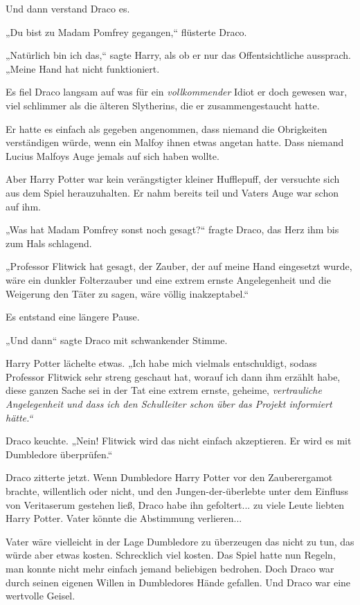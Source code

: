 {Und dann verstand Draco es.

„Du bist zu Madam Pomfrey gegangen,“ flüsterte Draco.

„Natürlich bin ich das,“ sagte Harry, als ob er nur das Offentsichtliche aussprach. „Meine Hand hat nicht funktioniert.

Es fiel Draco langsam auf was für ein \emph{vollkommender} Idiot er doch gewesen war, viel schlimmer als die älteren Slytherins, die er zusammengestaucht hatte.

Er hatte es einfach als gegeben angenommen, dass niemand die Obrigkeiten verständigen würde, wenn ein Malfoy ihnen etwas angetan hatte. Dass niemand Lucius Malfoys Auge jemals auf sich haben wollte.

Aber Harry Potter war kein verängstigter kleiner Hufflepuff, der versuchte sich aus dem Spiel herauzuhalten. Er nahm bereits teil und Vaters Auge war schon auf ihm.

„Was hat Madam Pomfrey sonst noch gesagt?“ fragte Draco, das Herz ihm bis zum Hals schlagend.

„Professor Flitwick hat gesagt, der Zauber, der auf meine Hand eingesetzt wurde, wäre ein dunkler Folterzauber und eine extrem ernste Angelegenheit und die Weigerung den Täter zu sagen, wäre völlig inakzeptabel.“

Es entstand eine längere Pause.

„Und dann“ sagte Draco mit schwankender Stimme.

Harry Potter lächelte etwas. „Ich habe mich vielmals entschuldigt, sodass Professor Flitwick sehr streng geschaut hat, worauf ich dann ihm erzählt habe, diese ganzen Sache sei in der Tat eine extrem ernste, geheime, \emph{vertrauliche Angelegenheit und dass ich den Schulleiter schon über das Projekt informiert hätte.“}

Draco keuchte. „Nein! Flitwick wird das nicht einfach akzeptieren. Er wird es mit Dumbledore überprüfen.“

Draco zitterte jetzt. Wenn Dumbledore Harry Potter vor den Zauberergamot brachte, willentlich oder nicht, und den Jungen-der-überlebte unter dem Einfluss von Veritaserum gestehen ließ, Draco habe ihn gefoltert... zu viele Leute liebten Harry Potter. Vater könnte die Abstimmung verlieren...

Vater wäre vielleicht in der Lage Dumbledore zu überzeugen das nicht zu tun, das würde aber etwas kosten. Schrecklich viel kosten. Das Spiel hatte nun Regeln, man konnte nicht mehr einfach jemand beliebigen bedrohen. Doch Draco war durch seinen eigenen Willen in Dumbledores Hände gefallen. Und Draco war eine wertvolle Geisel.

}
